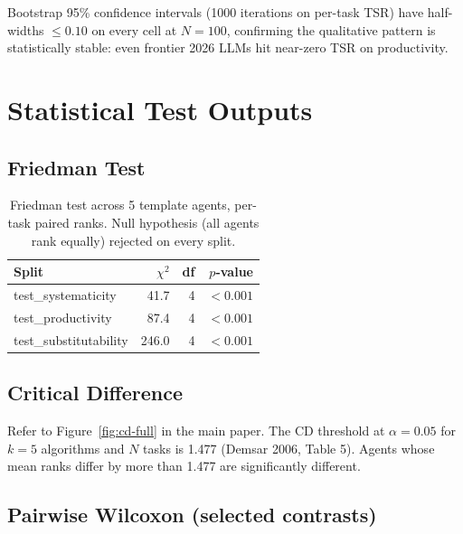 \documentclass[10pt]{article}
\begin{document}
Bootstrap 95\% confidence intervals (1000 iterations on per-task TSR) have
half-widths $\leq 0.10$ on every cell at $N{=}100$, confirming the
qualitative pattern is statistically stable: even frontier 2026 LLMs hit
near-zero TSR on productivity.

\section{Statistical Test Outputs}
\label{app:stats-full}

\subsection{Friedman Test}

\begin{table}[h]
    \centering
    \small
    \begin{tabular}{lrrr}
        \toprule
        Split & $\chi^2$ & df & $p$-value \\
        \midrule
        test\_systematicity    & 41.7  & 4 & $< 0.001$ \\
        test\_productivity     & 87.4  & 4 & $< 0.001$ \\
        test\_substitutability & 246.0 & 4 & $< 0.001$ \\
        \bottomrule
    \end{tabular}
    \caption{Friedman test across 5 template agents, per-task paired ranks. Null hypothesis (all agents rank equally) rejected on every split.}
    \label{tab:friedman-full}
\end{table}

\subsection{Critical Difference}

Refer to Figure~\ref{fig:cd-full} in the main paper. The CD threshold at
$\alpha = 0.05$ for $k = 5$ algorithms and $N$ tasks is 1.477 (Demsar 2006,
Table 5). Agents whose mean ranks differ by more than 1.477 are
significantly different.

\subsection{Pairwise Wilcoxon (selected contrasts)}
\end{document}
